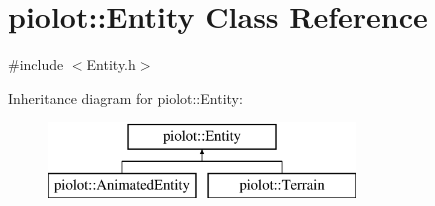 \hypertarget{classpiolot_1_1_entity}{}\section{piolot\+:\+:Entity Class Reference}
\label{classpiolot_1_1_entity}


{\ttfamily \#include $<$Entity.\+h$>$}

Inheritance diagram for piolot\+:\+:Entity\+:\begin{figure}[H]
\begin{center}
\leavevmode
\includegraphics[height=2.000000cm]{classpiolot_1_1_entity}
\end{center}
\end{figure}
